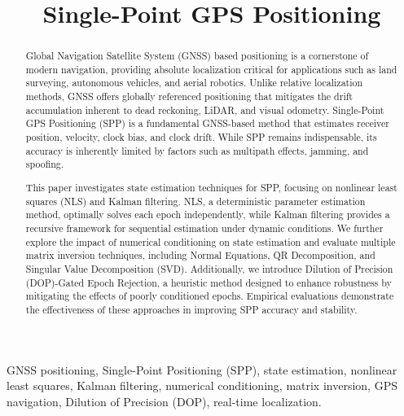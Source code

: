\documentclass[conference]{IEEEtran}
\begin{document}
\title{Single-Point GPS Positioning}

\author{
}

\maketitle

\begin{abstract}
Global Navigation Satellite System (GNSS) based positioning is a cornerstone of modern navigation, providing absolute localization critical for applications such as land surveying, autonomous vehicles, and aerial robotics. Unlike relative localization methods, GNSS offers globally referenced positioning that mitigates the drift accumulation inherent to dead reckoning, LiDAR, and visual odometry. Single-Point GPS Positioning (SPP) is a fundamental GNSS-based method that estimates receiver position, velocity, clock bias, and clock drift. While SPP remains indispensable, its accuracy is inherently limited by factors such as multipath effects, jamming, and spoofing.

This paper investigates state estimation techniques for SPP, focusing on nonlinear least squares (NLS) and Kalman filtering. NLS, a deterministic parameter estimation method, optimally solves each epoch independently, while Kalman filtering provides a recursive framework for sequential estimation under dynamic conditions. We further explore the impact of numerical conditioning on state estimation and evaluate multiple matrix inversion techniques, including Normal Equations, QR Decomposition, and Singular Value Decomposition (SVD). Additionally, we introduce Dilution of Precision (DOP)-Gated Epoch Rejection, a heuristic method designed to enhance robustness by mitigating the effects of poorly conditioned epochs. Empirical evaluations demonstrate the effectiveness of these approaches in improving SPP accuracy and stability.
\end{abstract}

\begin{IEEEkeywords}
GNSS positioning, Single-Point Positioning (SPP), state estimation, nonlinear least squares, Kalman filtering, numerical conditioning, matrix inversion, GPS navigation, Dilution of Precision (DOP), real-time localization.
\end{IEEEkeywords}
\end{document}
